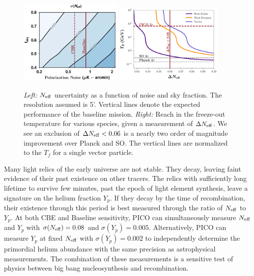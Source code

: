 \documentclass[PICOReport.tex]{subfiles}
\begin{document}
\begin{figure}[t!]
\begin{center}
\includegraphics[width=0.45\textwidth]{images/Neff_final.pdf}
\includegraphics[width=0.47\textwidth]{images/Tf_pico.pdf}
\vspace{-0.15in}
\caption{ \small \setlength{\baselineskip}{0.95\baselineskip}
\textit{Left:} ${N_{\rm eff}}$ uncertainty as a function of noise and sky fraction. The resolution assumed is 5'.   Vertical lines denote the expected performance of the baseline mission. \textit{Right:} Reach in the freeze-out temperature for various species, given a measurement of $\Delta {N_{\rm eff}}$.  We see an exclusion of $\Delta {N_{\rm eff}} < 0.06$ is a nearly two order of magnitude improvement over Planck and SO.  The vertical lines are normalized to the $T_f$ for a single vector particle.
\label{fig:Neff_future}}
\end{center}
\vspace{-0.15in}
\end{figure}

Many light relics of the early universe are not stable. They decay, leaving faint evidence of their past existence on other tracers. The relics with sufficiently long lifetime to survive few minutes, past the epoch of light element synthesis, leave a signature on the helium fraction $Y_p$.  If they decay by the time of recombination, their existence through this period is best measured through the ratio of ${N_{\rm eff}}$ to $Y_p$. At both CBE and Baseline sensitivity, PICO can simultaneously measure ${N_{\rm eff}}$ and $Y_p$ with $\sigma({N_{\rm eff}}) = 0.08$ and $\sigma(Y_p) =0.005$.  Alternatively, PICO can measure $Y_p$ at fixed ${N_{\rm eff}}$ with $\sigma(Y_p) =0.002$ to independently determine the primordial helium abundance with the same precision as astrophysical measurements.  The combination of these measurements is a sensitive test of physics between big bang nucleosynthesis and recombination.  
\end{document}
